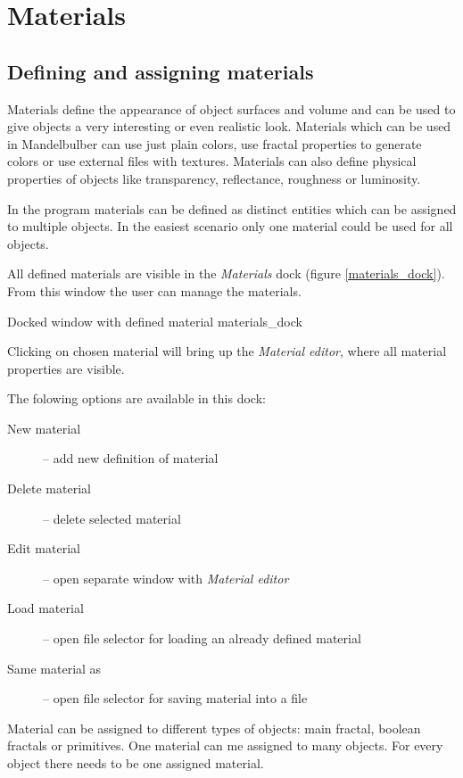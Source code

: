 \section{Materials}\label{materials}

\subsection{Defining and assigning materials}\label{defining-materials}

Materials define the appearance of object surfaces and volume and can be used to give objects a very interesting or even realistic look. Materials which can be used in Mandelbulber can use just plain colors, use fractal properties to generate colors or use external files with textures. Materials can also define physical properties of objects like transparency, reflectance, roughness or luminosity. 

In the program materials can be defined as distinct entities which can be assigned to multiple objects. In the easiest scenario only one material could be used for all objects.

All defined materials are visible in the \emph{Materials} dock (figure \ref{materials_dock}).
From this window the user can manage the materials.

{Docked window with defined material}
{materials_dock}

Clicking on chosen material will bring up the \emph{Material editor}, where all material properties are visible.

The folowing options are available in this dock:

\begin{description}
		\item[New material] -- add new definition of material
		\item[Delete material] -- delete selected material
		\item[Edit material] -- open separate window with \emph{Material editor}
		\item[Load material] -- open file selector for loading an already defined material
		\item[Same material as] -- open file selector for saving material into a file
\end{description}

Material can be assigned to different types of objects: main fractal, boolean fractals or primitives. One material can me assigned to many objects. For every object there needs to be one assigned material.


